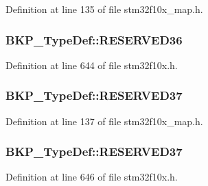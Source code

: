 Definition at line 135 of file stm32f10x\+\_\+map.\+h.

\subsubsection[{\texorpdfstring{R\+E\+S\+E\+R\+V\+E\+D36}{RESERVED36}}]{ B\+K\+P\+\_\+\+Type\+Def\+::\+R\+E\+S\+E\+R\+V\+E\+D36}\hypertarget{struct_b_k_p___type_def_ae1ce83ff07412d2e7fa433fc7f19c16d}{}\label{struct_b_k_p___type_def_ae1ce83ff07412d2e7fa433fc7f19c16d}


Definition at line 644 of file stm32f10x.\+h.

\subsubsection[{\texorpdfstring{R\+E\+S\+E\+R\+V\+E\+D37}{RESERVED37}}]{ B\+K\+P\+\_\+\+Type\+Def\+::\+R\+E\+S\+E\+R\+V\+E\+D37}\hypertarget{struct_b_k_p___type_def_a2d605b4691868c3e71d9080c332fe7c5}{}\label{struct_b_k_p___type_def_a2d605b4691868c3e71d9080c332fe7c5}


Definition at line 137 of file stm32f10x\+\_\+map.\+h.

\subsubsection[{\texorpdfstring{R\+E\+S\+E\+R\+V\+E\+D37}{RESERVED37}}]{ B\+K\+P\+\_\+\+Type\+Def\+::\+R\+E\+S\+E\+R\+V\+E\+D37}\hypertarget{struct_b_k_p___type_def_aec1b55fb54cac464f7733cf478a652dc}{}\label{struct_b_k_p___type_def_aec1b55fb54cac464f7733cf478a652dc}


Definition at line 646 of file stm32f10x.\+h.

